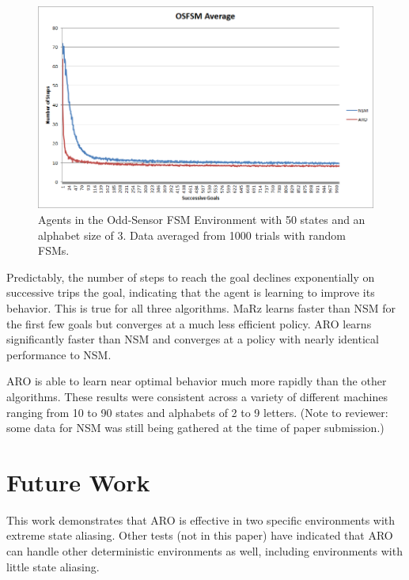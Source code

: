 \documentclass[letterpaper]{article} %
\begin{document}
\begin{figure}[t]
	\centering
	\includegraphics[width=0.9\columnwidth]{OSFSMGraph.png} %
	\caption{Agents in the Odd-Sensor FSM Environment with 50 states and an alphabet size of 3. Data averaged from 1000 trials with random FSMs.}
	\label{fig5}
\end{figure}

Predictably, the number of steps to reach the goal declines
exponentially on successive trips the goal, indicating that the agent
is learning to improve its behavior.  This is true for all three
algorithms. MaRz learns faster than NSM for the first few goals but
converges at a much less efficient policy.  ARO learns significantly
faster than NSM and converges at a policy with nearly identical
performance to NSM.

ARO is able to learn near optimal behavior much more rapidly than the
other algorithms.  These results were consistent across a variety of
different machines ranging from 10 to 90 states and alphabets of 2 to
9 letters. (Note to reviewer: some data for NSM was still being
gathered at the time of paper submission.)

\section{Future Work}

This work demonstrates that ARO is effective in two specific
environments with extreme state aliasing. Other tests (not in this
paper) have indicated that ARO can handle other deterministic
environments as well, including environments with little state
aliasing.
\end{document}
